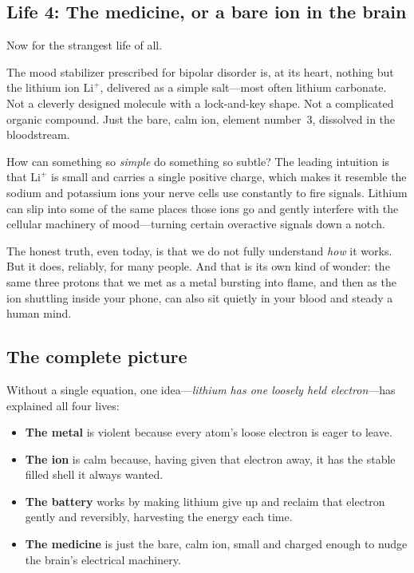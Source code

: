 \documentclass[11pt, letterpaper]{article}
\newcommand{\Lip}{\text{Li}^{+}}
\begin{document}
\subsection{Life 4: The medicine, or a bare ion in the brain}

Now for the strangest life of all.

The mood stabilizer prescribed for bipolar disorder is, at its heart, nothing but the lithium ion $\Lip$, delivered as a simple salt---most often lithium carbonate. Not a cleverly designed molecule with a lock-and-key shape. Not a complicated organic compound. Just the bare, calm ion, element number~3, dissolved in the bloodstream.

How can something so \textit{simple} do something so subtle? The leading intuition is that $\Lip$ is small and carries a single positive charge, which makes it resemble the sodium and potassium ions your nerve cells use constantly to fire signals. Lithium can slip into some of the same places those ions go and gently interfere with the cellular machinery of mood---turning certain overactive signals down a notch.

The honest truth, even today, is that we do not fully understand \textit{how} it works. But it does, reliably, for many people. And that is its own kind of wonder: the same three protons that we met as a metal bursting into flame, and then as the ion shuttling inside your phone, can also sit quietly in your blood and steady a human mind.

\subsection{The complete picture}

Without a single equation, one idea---\textit{lithium has one loosely held electron}---has explained all four lives:

\begin{itemize}[nosep]
  \item \textbf{The metal} is violent because every atom's loose electron is eager to leave.
  \item \textbf{The ion} is calm because, having given that electron away, it has the stable filled shell it always wanted.
  \item \textbf{The battery} works by making lithium give up and reclaim that electron gently and reversibly, harvesting the energy each time.
  \item \textbf{The medicine} is just the bare, calm ion, small and charged enough to nudge the brain's electrical machinery.
\end{itemize}
\end{document}
